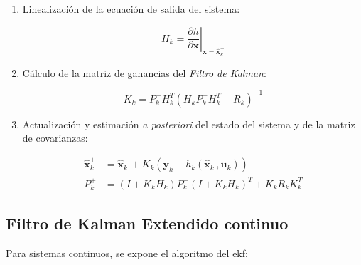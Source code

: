 \begin{enumerate}
\item Linealización de la ecuación de salida del sistema:

\begin{equation}
	H_k = \left.\frac{\partial h}{\partial\boldsymbol{x}} \right|_{\boldsymbol{x} = \boldsymbol{\hat{x}}_k^{-}}
\end{equation}

\item Cálculo de la matriz de ganancias del \emph{Filtro de Kalman}:

\begin{equation}
	K_k = P_k^{-}H_k^T(H_kP_k^{-}H_k^T + R_k)^{-1}
\end{equation}

\item Actualización y estimación \emph{a posteriori} del estado del sistema y de la matriz de covarianzas:

\begin{equation}
\begin{split}
	\boldsymbol{\hat{x}}_k^{+} &= \boldsymbol{\hat{x}}_k^{-} + K_k(\boldsymbol{y}_k - h_{k}(\boldsymbol{\hat{x}}_{k}^{-},\boldsymbol{u}_{k})) \\
	P_k^{+} &= (I + K_kH_k)P_k^{-}(I + K_kH_k)^T + K_kR_kK_k^T
\end{split}
\end{equation}

\end{enumerate}

\subsection{Filtro de Kalman Extendido continuo}
\noindent
Para sistemas continuos, se expone el algoritmo del \acrshort{ekf}:

